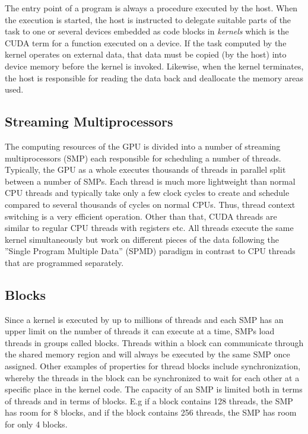 The entry point of a program is always a procedure executed by the host. When the execution is started, the host is instructed to delegate suitable parts of the task to one or several devices embedded as code blocks in \emph{kernels} which is the CUDA term for a function executed on a device. If the task computed by the kernel operates on external data, that data must be copied (by the host) into device memory before the kernel is invoked. Likewise, when the kernel terminates, the host is responsible for reading the data back and deallocate the memory areas used.\\

\subsection{Streaming Multiprocessors}
The computing resources of the GPU is divided into a number of streaming multiprocessors (SMP) each responsible for scheduling a number of threads. Typically, the GPU as a whole executes thousands of threads in parallel split between a number of SMPs. Each thread is much more lightweight than normal CPU threads and typically take only a few clock cycles to create and schedule compared to several thousands of cycles on normal CPUs. Thus, thread context switching is a very efficient operation. Other than that, CUDA threads are similar to regular CPU threads with registers etc. All threads execute the same kernel simultaneously but work on different pieces of the data following the ''Single Program Multiple Data'' (SPMD) paradigm in contrast to CPU threads that are programmed separately. \\

\subsection{Blocks}
Since a kernel is executed by up to millions of threads and each SMP has an upper limit on the number of threads it can execute at a time, SMPs load threads in groups called blocks. Threads within a block can communicate through the shared memory region and will always be executed by the same SMP once assigned. Other examples of properties for thread blocks include synchronization, whereby the threads in the block can be synchronized to wait for each other at a specific place in the kernel code. The capacity of an SMP is limited both in terms of threads and in terms of blocks. E.g if a block contains 128 threads, the SMP has room for 8 blocks, and if the block contains 256 threads, the SMP has room for only 4 blocks.


